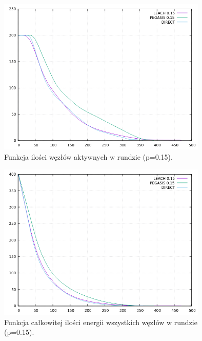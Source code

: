 \documentclass[a4paper,12pt,twoside,openany]{report}
\begin{document}
\begin{figure}[H]
 \centering
 \includegraphics[width=10cm]{images/gnuplot/test_4/nodes_in_round_p015.png}
 \caption{Funkcja ilości węzłów aktywnych w rundzie (p=0.15).}
\end{figure}

\begin{figure}[H]
 \centering
 \includegraphics[width=10cm]{images/gnuplot/test_4/energy_in_round_p015.png}
 \caption{Funkcja całkowitej ilości energii wszystkich węzłów w rundzie (p=0.15).}
\end{figure}
\end{document}
